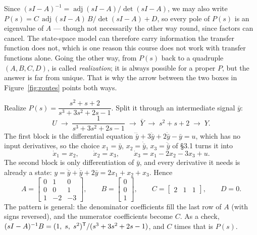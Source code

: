 \documentclass[11pt]{article}
\begin{document}
\begin{remark}
Since $(sI-A)^{-1} = \operatorname{adj}(sI-A)/\det(sI-A)$, we may also write
$P(s) = C\,\operatorname{adj}(sI-A)\,B/\det(sI-A) + D$, so every pole of $P(s)$
is an eigenvalue of $A$ --- though not necessarily the other way round, since
factors can cancel. The state-space model can therefore carry information the
transfer function does not, which is one reason this course does not work with
transfer functions alone. Going the other way, from $P(s)$ back to a quadruple
$(A,B,C,D)$, is called \emph{realization}; it is always possible for a proper
$P$, but the answer is far from unique. That is why the arrow between the two
boxes in Figure~\ref{fig:routes} points both ways.
\end{remark}

\begin{example}\label{ex:realization}
Realize $P(s)=\dfrac{s^{2}+s+2}{s^{3}+3s^{2}+2s-1}$. Split it through an
intermediate signal $\bar y$:
\[
   U \;\longrightarrow\; \boxed{\dfrac{1}{s^{3}+3s^{2}+2s-1}} \;\longrightarrow\;
   \bar Y \;\longrightarrow\; \boxed{s^{2}+s+2} \;\longrightarrow\; Y .
\]
The first block is the differential equation
$\dddot{\bar y}+3\ddot{\bar y}+2\dot{\bar y}-\bar y=u$, which has no input
derivatives, so the choice $x_1=\bar y$, $x_2=\dot{\bar y}$, $x_3=\ddot{\bar y}$
of \S3.1 turns it into
\[
   \dot x_1=x_2,\qquad \dot x_2=x_3,\qquad \dot x_3 = x_1-2x_2-3x_3+u .
\]
The second block is only differentiation of $\bar y$, and every derivative it needs
is already a state: $y=\ddot{\bar y}+\dot{\bar y}+2\bar y = 2x_1+x_2+x_3$. Hence
\[
   A=\begin{bmatrix}0&1&0\\0&0&1\\1&-2&-3\end{bmatrix},\qquad
   B=\begin{bmatrix}0\\0\\1\end{bmatrix},\qquad
   C=\begin{bmatrix}2&1&1\end{bmatrix},\qquad D=0 .
\]
The pattern is general: the denominator coefficients fill the last row of $A$
(with signs reversed), and the numerator coefficients become $C$. As a check,
$(sI-A)^{-1}B=(1,\;s,\;s^{2})^{\mathsf{T}}/(s^{3}+3s^{2}+2s-1)$, and $C$ times that is
$P(s)$.
\end{example}

\end{document}
